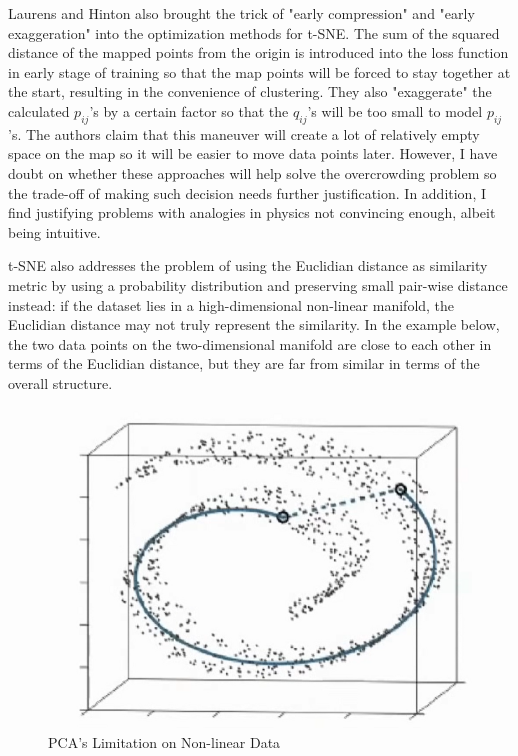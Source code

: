 \documentclass[letter,10pt]{article}
\begin{document}
Laurens and Hinton also brought the trick of "early compression" and "early exaggeration" into the optimization methods for t-SNE. The sum of the squared distance of the mapped points from the origin is introduced into the loss function in early stage of training so that the map points will be forced to stay together at the start, resulting in the convenience of clustering. They also "exaggerate" the calculated $p_{ij}$'s by a certain factor so that the $q_{ij}$'s will be too small to model $p_{ij}$'s. The authors claim that this maneuver will create a lot of relatively empty space on the map so it will be easier to move data points later. However, I have doubt on whether these approaches will help solve the overcrowding problem so the trade-off of making such decision needs further justification. In addition, I find justifying problems with analogies in physics not convincing enough, albeit being intuitive.

t-SNE also addresses the problem of using the Euclidian distance as similarity metric by using a probability distribution and preserving small pair-wise distance instead: if the dataset lies in a high-dimensional non-linear manifold, the Euclidian distance may not truly represent the similarity. In the example below, the two data points on the two-dimensional manifold are close to each other in terms of the Euclidian distance, but they are far from similar in terms of the overall structure. 

\begin{figure}[H]
    \centering
    \includegraphics[scale=0.5]{pca_limitation}
    \caption{PCA's Limitation on Non-linear Data}
    \label{fig:pca_limitation}
\end{figure}
\end{document}
